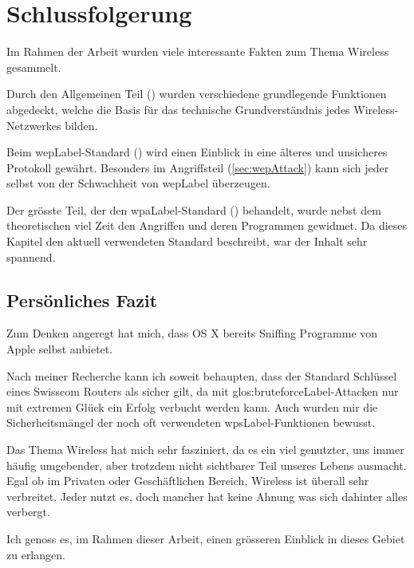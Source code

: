 \chapter{Schlussfolgerung}

Im Rahmen der Arbeit wurden viele interessante Fakten zum Thema Wireless gesammelt.

Durch den Allgemeinen Teil () wurden verschiedene grundlegende Funktionen abgedeckt, welche die Basis für das technische Grundverständnis jedes Wireless-Netzwerkes bilden.

Beim \gls{wepLabel}-Standard () wird einen Einblick in eine älteres und unsicheres Protokoll gewährt.
Besonders im Angriffsteil (\cref{sec:wepAttack}) kann sich jeder selbst von der Schwachheit von \gls{wepLabel} überzeugen.

Der grösste Teil, der den \gls{wpaLabel}-Standard () behandelt, wurde nebst dem theoretischen viel Zeit den Angriffen und deren Programmen gewidmet.
Da dieses Kapitel den aktuell verwendeten Standard beschreibt, war der Inhalt sehr spannend.


\section{Persönliches Fazit}
Zum Denken angeregt hat mich, dass OS X bereits Sniffing Programme von Apple selbst anbietet.

Nach meiner Recherche kann ich soweit behaupten, dass der Standard Schlüssel eines Swisscom Routers als sicher gilt, da mit \gls{glos:bruteforceLabel}-Attacken nur mit extremen Glück ein Erfolg verbucht werden kann.
Auch wurden mir die Sicherheitsmängel der noch oft verwendeten \gls{wpsLabel}-Funktionen bewusst.

Das Thema Wireless hat mich sehr fasziniert, da es ein viel genutzter, uns immer häufig umgebender, aber trotzdem nicht sichtbarer Teil unseres Lebens ausmacht.
Egal ob im Privaten oder Geschäftlichen Bereich, Wireless ist überall sehr verbreitet.
Jeder nutzt es, doch mancher hat keine Ahnung was sich dahinter alles verbergt.

Ich genoss es, im Rahmen dieser Arbeit, einen grösseren Einblick in dieses Gebiet zu erlangen.
